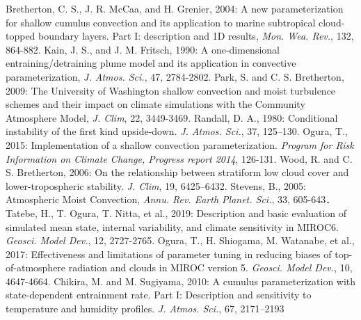 \documentclass[platex, dvipdfmx]{article}
\begin{document}
\begin{thebibliography}{99}
     Bretherton, C. S., J. R. McCaa, and H. Grenier, 2004: 
        A new parameterization for shallow cumulus convection and its application to marine subtropical cloud-topped boundary layers. 
        Part I: description and 1D results, \textit{Mon. Wea. Rev.}, 132, 864-882.
    Kain, J. S., and J. M. Fritsch, 1990: 
        A one-dimensional entraining/detraining plume model and its application in convective parameterization,
        \textit{J. Atmos. Sci.}, 47, 2784-2802.
     Park, S. and C. S. Bretherton, 2009: 
        The University of Washington shallow convection and moist turbulence schemes and their impact on 
        climate simulations with the Community Atmosphere Model, \textit{J. Clim}, 22, 3449-3469.
     Randall, D. A., 1980: 
        Conditional instability of the first kind upside-down. \textit{J. Atmos. Sci.}, 37, 125–130.
     Ogura, T., 2015: 
        Implementation of a shallow convection parameterization. \textit{Program for Risk Information on Climate Change, 
        Progress report 2014}, 126-131.
     Wood, R. and C. S. Bretherton, 2006: 
        On the relationship between stratiform low cloud cover and lower-tropospheric stability. 
        \textit{J. Clim}, 19, 6425–6432.
     Stevens, B., 2005: 
        Atmospheric Moist Convection, \textit{Annu. Rev. Earth Planet. Sci.}, 33, 605-643．
     Tatebe, H., T. Ogura, T. Nitta, et al., 2019: 
        Description and basic evaluation of simulated mean state, internal variability, and climate sensitivity in MIROC6.
        \textit{Geosci. Model Dev.}, 12, 2727-2765.
     Ogura, T., H. Shiogama, M. Watanabe, et al., 2017:
        Effectiveness and limitations of parameter tuning in reducing biases of top-of-atmosphere radiation and clouds in MIROC version 5.
        \textit{Geosci. Model Dev.}, 10, 4647-4664.
    Chikira, M. and M. Sugiyama, 2010: 
        A cumulus parameterization with state-dependent entrainment rate. Part I: Description and sensitivity to temperature and humidity profiles.
        \textit{J. Atmos. Sci.}, 67, 2171–2193
\end{thebibliography}
\end{document}
